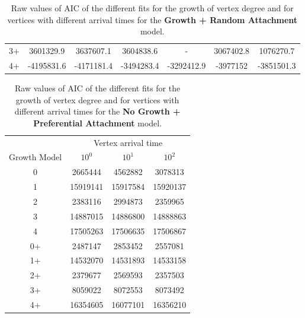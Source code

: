 \begin{table}[H]
\begin{tabular}{ccccccc}
\multicolumn{1}{c|}{3+}           & 3601329.9                  & 3637607.1                  & 3604838.6                  & -                          & 3067402.8                  & 1076270.7                  \\
\multicolumn{1}{c|}{4+}           & -4195831.6                 & -4171181.4                 & -3494283.4                 & -3292412.9                 & -3977152                   & -3851501.3                
\end{tabular}
\caption{Raw values of AIC of the different fits for the growth of vertex degree and for vertices with different arrival times for the \textbf{Growth + Random Attachment} model.}
\label{tab:RA_evolution_AIC}
\end{table}




\begin{table}[H]
\centering
\begin{tabular}{cccc}
                                  & \multicolumn{3}{c}{Vertex arrival time} \\
\multicolumn{1}{c|}{Growth Model} & $10^0$      & $10^1$      & $10^2$      \\ \hline
\multicolumn{1}{c|}{0}            & 2665444     & 4562882     & 3078313     \\
\multicolumn{1}{c|}{1}            & 15919141    & 15917584    & 15920137    \\
\multicolumn{1}{c|}{2}            & 2383116     & 2994873     & 2359965     \\
\multicolumn{1}{c|}{3}            & 14887015    & 14886800    & 14888863    \\
\multicolumn{1}{c|}{4}            & 17505263    & 17506635    & 17506867    \\
\multicolumn{1}{c|}{0+}           & 2487147     & 2853452     & 2557081     \\
\multicolumn{1}{c|}{1+}           & 14532070    & 14531893    & 14533158    \\
\multicolumn{1}{c|}{2+}           & 2379677     & 2569593     & 2357503     \\
\multicolumn{1}{c|}{3+}           & 8059022     & 8072553     & 8073492     \\
\multicolumn{1}{c|}{4+}           & 16354605    & 16077101    & 16356210   
\end{tabular}
\caption{Raw values of AIC of the different fits for the growth of vertex degree and for vertices with different arrival times for the \textbf{No Growth + Preferential Attachment} model.}
\label{tab:NG_evolution_AIC}
\end{table}